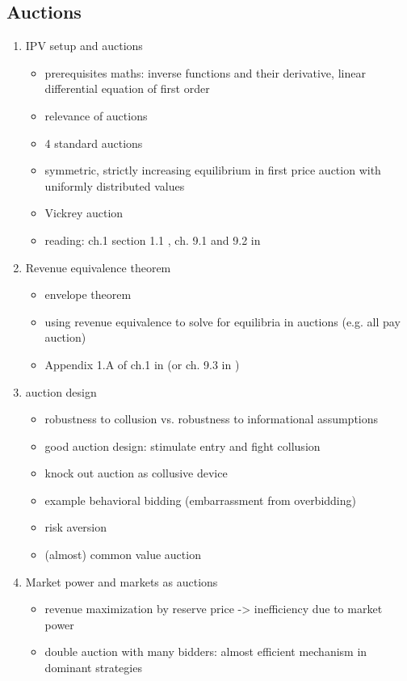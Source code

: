 \documentclass[11pt]{article}
\begin{document}
\subsection{Auctions}
\label{sec:orgb189add}
\begin{enumerate}
\item IPV setup and auctions
\label{sec:org5cc4c64}
\begin{itemize}
\item prerequisites maths: inverse functions and their derivative, linear differential equation of first order
\item relevance of auctions
\item 4 standard auctions
\item symmetric, strictly increasing equilibrium in first price auction with uniformly distributed values
\item Vickrey auction
\item reading: ch.1 section 1.1 \cite{klemperer2004auctions}, ch. 9.1 and 9.2 in \cite{jehle2001advanced}
\end{itemize}
\item Revenue equivalence theorem
\label{sec:orge0dc055}
\begin{itemize}
\item envelope theorem
\item using revenue equivalence to solve for equilibria in auctions (e.g. all pay auction)
\item Appendix 1.A of ch.1  in \cite{klemperer2004auctions} (or ch. 9.3 in \cite{jehle2001advanced})
\end{itemize}
\item auction design
\label{sec:org0fc7756}
\begin{itemize}
\item robustness to collusion vs. robustness to informational assumptions
\item good auction design: stimulate entry and fight collusion
\item knock out auction as collusive device
\item example behavioral bidding (embarrassment from overbidding)
\item risk aversion
\item (almost) common value auction
\end{itemize}
\item Market power and markets as auctions
\label{sec:orgc8a62d2}
\begin{itemize}
\item revenue maximization by reserve price -> inefficiency due to market power
\item double auction with many bidders: almost efficient mechanism in dominant strategies
\end{itemize}
\end{enumerate}
\end{document}
